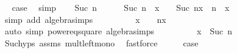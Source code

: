\begin{isabellebody}
\ \isamarkupfalse%
\ {\isacharquery}{\kern0pt}case\ \isamarkupfalse%
\ simp\isanewline
{}\isamarkupfalse%
\isanewline
\ \ \isamarkupfalse%
\ {\isacharparenleft}{\kern0pt}Suc\ n{\isacharparenright}{\kern0pt}\isanewline
\ \ \isamarkupfalse%
\ {\isachardoublequoteopen}{}\ {\isacharplus}{\kern0pt}\ Suc\ n\ {\isacharasterisk}{\kern0pt}\ x\ {\isasymle}\ {}\ {\isacharplus}{\kern0pt}\ {\isacharparenleft}{\kern0pt}Suc\ n{\isacharparenright}{\kern0pt}{\isacharasterisk}{\kern0pt}x\ {\isacharplus}{\kern0pt}\ n\ {\isacharasterisk}{\kern0pt}\ x{\isacharcircum}{\kern0pt}{}{\isachardoublequoteclose}\isanewline
\ \ \ \ \isamarkupfalse%
\ {\isacharparenleft}{\kern0pt}simp\ add{\isacharcolon}{\kern0pt}\ algebra{\isacharunderscore}{\kern0pt}simps{\isacharparenright}{\kern0pt}\isanewline
\ \ \isamarkupfalse%
\ \isamarkupfalse%
\ {\isachardoublequoteopen}{\isachardot}{\kern0pt}{\isachardot}{\kern0pt}{\isachardot}{\kern0pt}\ {\isacharequal}{\kern0pt}\ {\isacharparenleft}{\kern0pt}{}\ {\isacharplus}{\kern0pt}\ x{\isacharparenright}{\kern0pt}\ {\isacharasterisk}{\kern0pt}\ {\isacharparenleft}{\kern0pt}{}\ {\isacharplus}{\kern0pt}\ n{\isacharasterisk}{\kern0pt}x{\isacharparenright}{\kern0pt}{\isachardoublequoteclose}\isanewline
\ \ \ \ \isamarkupfalse%
\ {\isacharparenleft}{\kern0pt}auto\ simp{\isacharcolon}{\kern0pt}\ power{}{\isacharunderscore}{\kern0pt}eq{\isacharunderscore}{\kern0pt}square\ algebra{\isacharunderscore}{\kern0pt}simps{\isacharparenright}{\kern0pt}\isanewline
\ \ \isamarkupfalse%
\ \isamarkupfalse%
\ {\isachardoublequoteopen}{\isachardot}{\kern0pt}{\isachardot}{\kern0pt}{\isachardot}{\kern0pt}\ {\isasymle}\ {\isacharparenleft}{\kern0pt}{}\ {\isacharplus}{\kern0pt}\ x{\isacharparenright}{\kern0pt}\ {\isacharcircum}{\kern0pt}\ Suc\ n{\isachardoublequoteclose}\isanewline
\ \ \ \ \isamarkupfalse%
\ Suc{\isachardot}{\kern0pt}hyps\ assms\ mult{\isacharunderscore}{\kern0pt}left{\isacharunderscore}{\kern0pt}mono\ \isamarkupfalse%
\ fastforce\isanewline
\ \ \isamarkupfalse%
\ \isamarkupfalse%
\ {\isacharquery}{\kern0pt}case\ \isacommand{{\isachardot}{\kern0pt}}\isamarkupfalse%
\isanewline
{}\isamarkupfalse%
%
\endisatagproof
{\isafoldproof}%
%
\isadelimproof
\isanewline
%
\endisadelimproof
\isanewline
{}\isamarkupfalse%

\end{isabellebody}
